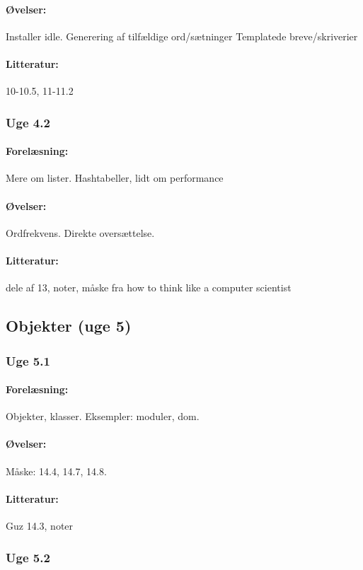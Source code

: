 \documentclass[12pt]{article}
\begin{document}
\paragraph{Øvelser:}
Installer idle.
Generering af tilfældige ord/sætninger
Templatede breve/skriverier
\paragraph{Litteratur:} 10-10.5, 11-11.2

\subsubsection{Uge 4.2}
\paragraph{Forelæsning:} 
Mere om lister.
Hashtabeller, lidt om performance
\paragraph{Øvelser:}
Ordfrekvens.
Direkte oversættelse.
\paragraph{Litteratur:} dele af 13, noter, måske fra how to think like a computer scientist

\subsection{Objekter (uge 5)}
\subsubsection{Uge 5.1}
\paragraph{Forelæsning:} 
Objekter, klasser.
Eksempler: moduler, dom.
\paragraph{Øvelser:}
Måske: 14.4, 14.7, 14.8.
\paragraph{Litteratur:} Guz 14.3, noter

\subsubsection{Uge 5.2}
\end{document}
